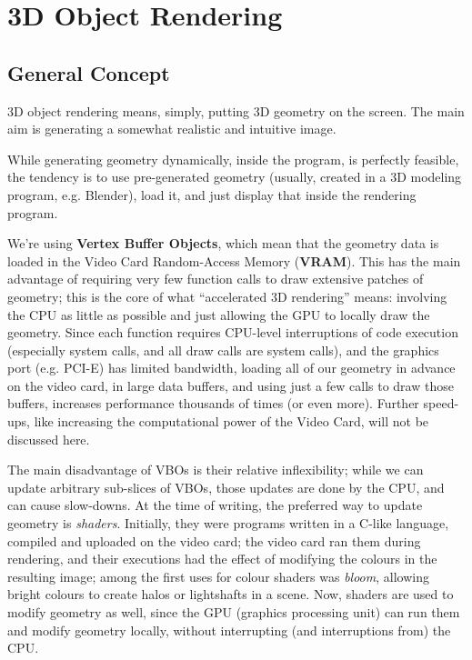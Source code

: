 \documentclass{scrartcl}
\begin{document}
\section{3D Object Rendering}
\subsection{General Concept}
3D object rendering means, simply, putting 3D geometry on the screen. The main aim is generating a somewhat realistic and intuitive image.

While generating geometry dynamically, inside the program, is perfectly feasible, the tendency is to use pre-generated geometry (usually, created in a 3D modeling program, e.g. Blender), load it, and just display that inside the rendering program.

We're using \textbf{Vertex Buffer Objects}, which mean that the geometry data is loaded in the Video Card Random-Access Memory (\textbf{VRAM}). This has the main advantage of requiring very few function calls to draw extensive patches of geometry; this is the core of what ``accelerated 3D rendering'' means: involving the CPU as little as possible and just allowing the GPU to locally draw the geometry. Since each function requires CPU-level interruptions of code execution (especially system calls, and all draw calls are system calls), and the graphics port (e.g. PCI-E) has limited bandwidth, loading all of our geometry in advance on the video card, in large data buffers, and using just a few calls to draw those buffers, increases performance thousands of times (or even more). Further speed-ups, like increasing the computational power of the Video Card, will not be discussed here.

The main disadvantage of VBOs is their relative inflexibility; while we can update arbitrary sub-slices of VBOs, those updates are done by the CPU, and can cause slow-downs. At the time of writing, the preferred way to update geometry is \textit{shaders}. Initially, they were programs written in a C-like language, compiled and uploaded on the video card; the video card ran them during rendering, and their executions had the effect of modifying the colours in the resulting image; among the first uses for colour shaders was \textit{bloom}, allowing bright colours to create halos or lightshafts in a scene. Now, shaders are used to modify geometry as well, since the GPU (graphics processing unit) can run them and modify geometry locally, without interrupting (and interruptions from) the CPU.
\end{document}
